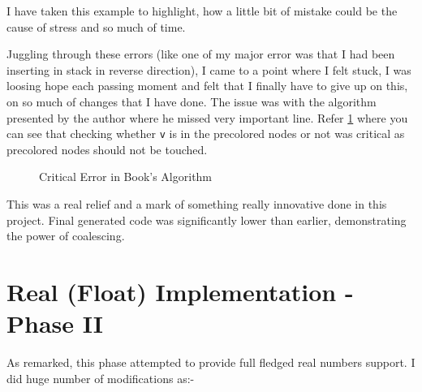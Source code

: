 I have taken this example to highlight, how a little bit of mistake could be the cause of stress and so much of time.

Juggling through these errors (like one of my major error was that I had been inserting in stack in reverse direction), I came to a point where I felt stuck, I was loosing hope each passing moment and felt that I finally have to give up on this, on so much of changes that I have done. The issue was with the algorithm presented by the author where he missed very important line. Refer \ref{fig:culprit} where you can see that checking whether \texttt{v} is in the precolored nodes or not was critical as precolored nodes should not be touched.

\begin{figure}
	\centering
	\caption{Critical Error in Book's Algorithm}
	\label{fig:culprit}
\end{figure}

This was a real relief and a mark of something really innovative done in this project. Final generated code was significantly lower than earlier, demonstrating the power of coalescing.

\section{Real (Float) Implementation - Phase II}

As remarked, this phase attempted to provide full fledged real numbers support. I did huge number of modifications as:-

